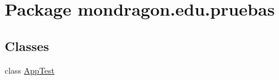\hypertarget{namespacemondragon_1_1edu_1_1pruebas}{}\section{Package mondragon.\+edu.\+pruebas}
\label{namespacemondragon_1_1edu_1_1pruebas}
\subsection*{Classes}
\begin{DoxyCompactItemize}
\item 
class \mbox{\hyperlink{classmondragon_1_1edu_1_1pruebas_1_1_app_test}{App\+Test}}
\end{DoxyCompactItemize}
